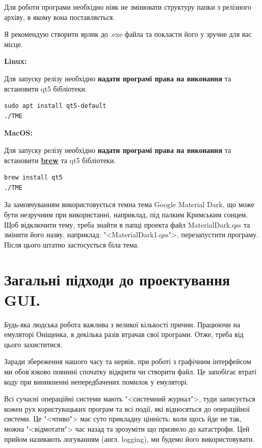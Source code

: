 \documentclass[oneside,final,14pt]{extreport}
\begin{document}
Для роботи програми необхідно ніяк не змінювати структуру папки з релізного архіву, в якому вона поставляється.

Я рекомендую створити ярлик до .exe файла та покласти його у зручне для вас місце.

\textbf{Linux:}

Для запуску релізу необхідно \textbf{надати програмі права на виконання} та встановити qt5 бібліотеки.
\begin{tcolorbox}	
\begin{verbatim}
sudo apt install qt5-default
./TME
\end{verbatim}
\end{tcolorbox}

\textbf{MacOS:}

Для запуску релізу необхідно \textbf{надати програмі права на виконання} та встановити \textbf{\href{https://brew.sh}{brew}} та qt5 бібліотеки.
\begin{tcolorbox}	
\begin{verbatim}
brew install qt5
./TME
\end{verbatim}
\end{tcolorbox}
		
За замовчуванням використовується темна тема Google Material Dark, що може бути незручним при використанні, наприклад, під палким Кримським сонцем. Щоб відключити тему, треба знайти в папці проекта файл MaterialDark.qss та змінити його назву, наприклад: "<MaterialDark1.qss">, перезапустити програму. Після цього штатно застосується біла тема.

\section{Загальні підходи до проектування GUI.}
Будь-яка людська робота важлива з великої кількості причин. Працюючи на емуляторі Оніщенка, я декілька разів втрачав свої програми. Отже, треба від цього захиститися.
		
Заради збереження нашого часу та нервів, при роботі з графічним інтерфейсом ми обов'язково повинні спочатку відкрити чи створити файл. Це запобігає втраті коду при виникненні непередбачених помилок у емуляторі.

Всі сучасні операційні системи мають "<системний журнал">, туди записується кожен рух користувацьких програм та всі події, які відносяться до операційної системи. Це "<чтиво"> має суто прикладну цінність: коли щось йде не так, можна "<відмотати"> час назад та зрозуміти що призвело до катастрофи. Цей прийом називають логуванням (англ. logging), ми будемо його використовувати.
\end{document}
